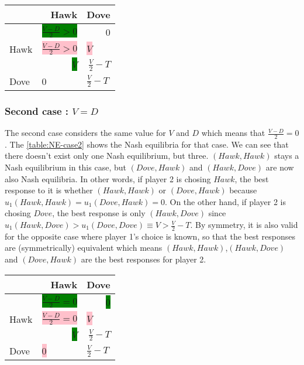 \documentclass{article}
\begin{document}
\begin{center}
\begin{tabular}{|l|r|r|}
  \hline
  			   & Hawk & Dove \\
  \hline
  		   & \hspace{1cm} \colorbox{green}{$\frac{V-D}{2}>0$} & 0 \\
  	Hawk &	\multicolumn{1}{|l|}{\colorbox{pink}{$\frac{V-D}{2}>0$}}		& 	\multicolumn{1}{|l|}{\colorbox{pink}{$V$}}		\\
  \hline
    		   & \multicolumn{1}{|r|}{\colorbox{green}{$V$}} & \hspace{1cm} $\frac{V}{2}-T$  \\
  Dove &	\multicolumn{1}{|l|}{0}		& 	\multicolumn{1}{|l|}{$\frac{V}{2}-T$}		\\
  \hline
\end{tabular}
\label{table:NE-case1}
\end{center}

\subsubsection{Second case : $V=D$}
The second case considers the same value for $V$ and $D$ which means that $\frac{V-D}{2} = 0$. The \autoref{table:NE-case2} shows the Nash equilibria for that case. We can see that there doesn't exist only one Nash equilibrium, but three. $(Hawk,Hawk)$ stays a Nash equilibrium in this case, but $(Dove,Hawk)$ and $(Hawk,Dove)$ are now also Nash equilibria. In other words, if player 2 is chosing $Hawk$, the best response to it is whether $(Hawk,Hawk)$ or $(Dove,Hawk)$ because $u_{1}(Hawk,Hawk)=u_{1}(Dove,Hawk)=0$. On the other hand, if player 2 is chosing $Dove$, the best response is only $(Hawk,Dove)$ since $u_{1}(Hawk,Dove)>u_{1}(Dove,Dove) \equiv V > \frac{V}{2}-T$. By symmetry, it is also valid for the opposite case where player 1's choice is known, so that the best  responses are (symmetrically) equivalent which means $(Hawk,Hawk)$,$(Hawk,Dove)$ and $(Dove, Hawk)$ are the best responses for player 2. 

\begin{center}
\begin{tabular}{|l|r|r|}
  \hline
  			   & Hawk & Dove \\
  \hline
  		   & \hspace{1cm} \colorbox{green}{$\frac{V-D}{2}=0$} & \colorbox{green}{0} \\
  	Hawk &	\multicolumn{1}{|l|}{\colorbox{pink}{$\frac{V-D}{2}=0$}}		& 	\multicolumn{1}{|l|}{\colorbox{pink}{$V$}}		\\
  \hline
    		   & \multicolumn{1}{|r|}{\colorbox{green}{$V$}} & \hspace{1cm} $\frac{V}{2}-T$  \\
  Dove &	\multicolumn{1}{|l|}{\colorbox{pink}{0}}		& 	\multicolumn{1}{|l|}{$\frac{V}{2}-T$}		\\
  \hline
\end{tabular}
\label{table:NE-case2}
\end{center}
\end{document}
